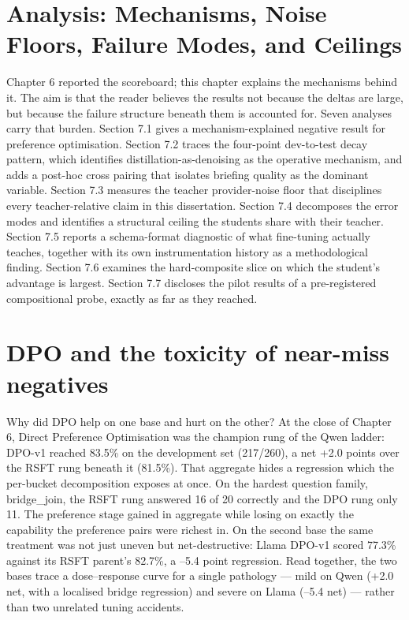 \section{Analysis: Mechanisms, Noise Floors, Failure Modes, and Ceilings}\label{sec:chapter-7-analysis-mechanisms-noise-floo}

Chapter 6 reported the scoreboard; this chapter explains the mechanisms behind it. The aim is that the reader believes the results not because the deltas are large, but because the failure structure beneath them is accounted for. Seven analyses carry that burden. Section 7.1 gives a mechanism-explained negative result for preference optimisation. Section 7.2 traces the four-point dev-to-test decay pattern, which identifies distillation-as-denoising as the operative mechanism, and adds a post-hoc cross pairing that isolates briefing quality as the dominant variable. Section 7.3 measures the teacher provider-noise floor that disciplines every teacher-relative claim in this dissertation. Section 7.4 decomposes the error modes and identifies a structural ceiling the students share with their teacher. Section 7.5 reports a schema-format diagnostic of what fine-tuning actually teaches, together with its own instrumentation history as a methodological finding. Section 7.6 examines the hard-composite slice on which the student's advantage is largest. Section 7.7 discloses the pilot results of a pre-registered compositional probe, exactly as far as they reached.

\section{DPO and the toxicity of near-miss negatives}\label{sec:dpo-and-the-toxicity-of-near-miss-negati}

Why did DPO help on one base and hurt on the other? At the close of Chapter 6, Direct Preference Optimisation was the champion rung of the Qwen ladder: DPO-v1 reached 83.5\% on the development set (217/260), a net +2.0 points over the RSFT rung beneath it (81.5\%). That aggregate hides a regression which the per-bucket decomposition exposes at once. On the hardest question family, bridge\_join, the RSFT rung answered 16 of 20 correctly and the DPO rung only 11. The preference stage gained in aggregate while losing on exactly the capability the preference pairs were richest in. On the second base the same treatment was not just uneven but net-destructive: Llama DPO-v1 scored 77.3\% against its RSFT parent's 82.7\%, a --5.4 point regression. Read together, the two bases trace a dose--response curve for a single pathology --- mild on Qwen (+2.0 net, with a localised bridge regression) and severe on Llama (--5.4 net) --- rather than two unrelated tuning accidents.

